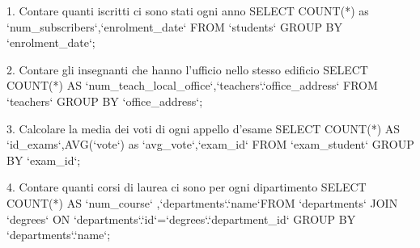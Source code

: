 1. Contare quanti iscritti ci sono stati ogni anno
SELECT COUNT(*) as `num_subscribers`,`enrolment_date` FROM `students` GROUP BY `enrolment_date`;

2. Contare gli insegnanti che hanno l'ufficio nello stesso edificio
SELECT COUNT(*) AS `num_teach_local_office`,`teachers`.`office_address` FROM `teachers` GROUP BY `office_address`;

3. Calcolare la media dei voti di ogni appello d'esame
SELECT COUNT(*) AS `id_exams`,AVG(`vote`) as `avg_vote`,`exam_id` FROM `exam_student` GROUP BY `exam_id`;


4. Contare quanti corsi di laurea ci sono per ogni dipartimento
SELECT COUNT(*) AS `num_course` ,`departments`.`name`FROM `departments` JOIN `degrees` ON `departments`.`id`=`degrees`.`department_id` GROUP BY `departments`.`name`;